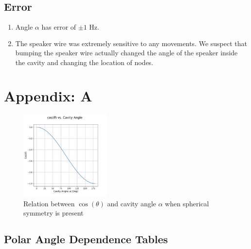 \documentclass[12pt]{article}
\begin{document}
		\subsection{Error}
			
			\begin{enumerate}
				\item Angle $\alpha$ has error of $\pm 1$ Hz.
				
				\item The speaker wire was extremely sensitive to any movements. We suspect that bumping the speaker wire actually changed the angle of the speaker inside the cavity and changing the location of nodes.
			\end{enumerate}
		
	\section{Appendix: A}
	\label{AppendixA}
	
	\begin{figure}[H]
		\captionsetup{justification = raggedright}
		\includegraphics[width=0.4\textwidth]{Graphs/ThetaAlpha.png}
		\caption{Relation between $\cos(\theta)$ and cavity angle $\alpha$ when spherical symmetry is present}
		\label{ThetaAlpha}
	\end{figure}
	
	\pagebreak
	\subsection{Polar Angle Dependence Tables}
	
\end{document}
